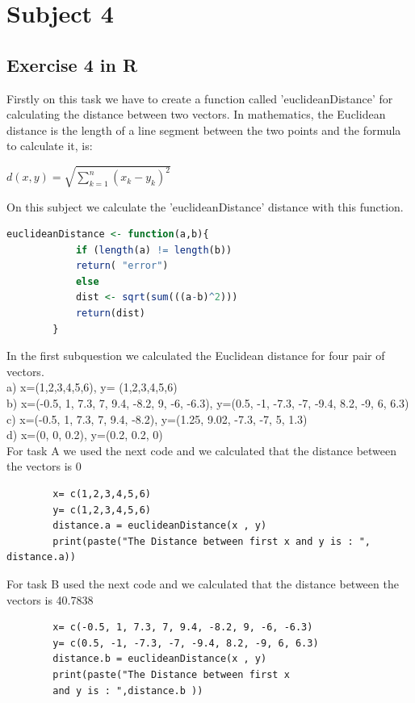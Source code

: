\documentclass[10pt,a4paper]{article}
\begin{document}
	\section{Subject 4}
	\subsection{Exercise 4 in R}
	Firstly on this task we have to create a function called 'euclideanDistance' for calculating the distance between two vectors. In mathematics, the Euclidean distance is the length of a line segment between the two points and the formula to calculate it, is:\\
	\begin{center}
		$d\left( x,y\right)   = \sqrt {\sum_{k=1}^{n}  \left( x_{k}-y_{k}\right)^2 } $\\
	\end{center}
	On this subject  we calculate the 'euclideanDistance' distance with this function. \\
	\begin{lstlisting}[language = R]
		euclideanDistance <- function(a,b){
			if (length(a) != length(b))
			return( "error")
			else 
			dist <- sqrt(sum(((a-b)^2)))
			return(dist)
		} 
	\end{lstlisting}
	In the first subquestion we calculated the Euclidean distance for four pair of vectors.\\
	a) x=(1,2,3,4,5,6), y= (1,2,3,4,5,6)\\
	b) x=(-0.5, 1, 7.3, 7, 9.4, -8.2, 9, -6, -6.3), y=(0.5, -1, -7.3, -7, -9.4, 8.2, -9, 6, 6.3)\\
	c) x=(-0.5, 1, 7.3, 7, 9.4, -8.2), y=(1.25, 9.02, -7.3, -7, 5, 1.3)\\
	d) x=(0, 0, 0.2), y=(0.2, 0.2, 0)\\
	For task A we used the next code and we calculated that the distance between the vectors is 0
	\begin{lstlisting}
		x= c(1,2,3,4,5,6)
		y= c(1,2,3,4,5,6)
		distance.a = euclideanDistance(x , y)
		print(paste("The Distance between first x and y is : ", distance.a))
	\end{lstlisting}
	For task B used the next code and we calculated that the distance between the vectors is 40.7838
	\begin{lstlisting}
		x= c(-0.5, 1, 7.3, 7, 9.4, -8.2, 9, -6, -6.3)
		y= c(0.5, -1, -7.3, -7, -9.4, 8.2, -9, 6, 6.3)
		distance.b = euclideanDistance(x , y)
		print(paste("The Distance between first x
		and y is : ",distance.b ))
	\end{lstlisting}	
\end{document}
